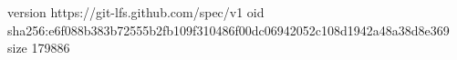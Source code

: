version https://git-lfs.github.com/spec/v1
oid sha256:e6f088b383b72555b2fb109f310486f00dc06942052c108d1942a48a38d8e369
size 179886
